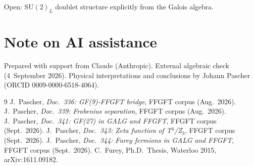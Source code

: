 Open: SU$(2)_L$ doublet structure explicitly from the Galois algebra.

\section*{Note on AI assistance}

Prepared with support from Claude (Anthropic). External algebraic check (4~September 2026).
Physical interpretations and conclusions by Johann Pascher (ORCID 0009-0000-6518-4064).

\begin{thebibliography}{9}
 J.~Pascher, \textit{Doc.~336: GF(9)-FFGFT bridge}, FFGFT corpus (Aug.\ 2026).
 J.~Pascher, \textit{Doc.~339: Frobenius separation}, FFGFT corpus (Aug.\ 2026).
 J.~Pascher, \textit{Doc.~341: GF(27) in GALG and FFGFT}, FFGFT corpus (Sept.\ 2026).
 J.~Pascher, \textit{Doc.~343: Zeta function of T$^4$/Z$_3$}, FFGFT corpus (Sept.\ 2026).
 J.~Pascher, \textit{Doc.~344: Furey fermions in GALG and FFGFT}, FFGFT corpus (Sept.\ 2026).
 C.~Furey, Ph.D.\ Thesis, Waterloo 2015, arXiv:1611.09182.
\end{thebibliography}

